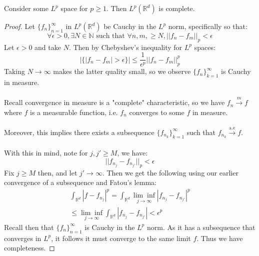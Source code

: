 \documentclass[12pt]{article}
\newcommand{\N}{\mathbb{N}}
\newcommand{\R}{\mathbb{R}}
\newenvironment{theorem}[2][Theorem]{\begin{trivlist}
\item[\hskip \labelsep {\bfseries #1}\hskip \labelsep {\bfseries #2.}]}{\end{trivlist}}
\begin{document}
\begin{theorem}{(Lp Spaces are Complete)}
    Consider some $L^p$ space for $p \geq 1$. Then $L^p(\R^d)$ is complete.
    \begin{proof}
        Let $\{f_n\}_{n = 1}^\infty$ in $L^p(\R^d)$ be Cauchy in the $L^p$ norm, specifically so that:
        $$\forall \epsilon > 0, \exists N \in \N \text{ such that } \forall n, m, \geq N, ||f_n - f_{m}||_p < \epsilon$$
        Let $\epsilon > 0$ and take $N$. Then by Chebyshev's inequality for $L^p$ spaces:
        \begin{equation}
            |\{|f_n - f_{m}| > \epsilon \}| \leq \frac{1}{\epsilon^p} ||f_n - f_{m}||_p^p
        \end{equation}
        Taking $N \rightarrow \infty$ makes the latter quality small, so we observe $\{f_n\}_{k = 1}^\infty$ is Cauchy in measure.  \\ \\
        Recall convergence in measure is a "complete" characteristic, so we have $f_n \xrightarrow{m} f$ where $f$ is a measurable function, i.e. $f_n$ converges to some $f$ in measure. \\ \\
        Moreover, this implies there exists a subsequence $\{f_{n_k}\}_{k = 1}^\infty$ such that $f_{n_k} \xrightarrow{\text{a.e}} f$. \\ \\
        With this in mind, note for $j, j' \geq M$, we have:
        $$||f_{n_j} - f_{n_{j'}}||_p < \epsilon$$
        Fix $j \geq M$ then, and let $j' \rightarrow \infty$. Then we get the following using our earlier convergence of a subsequence and Fatou's lemma:
        \begin{equation}
            \begin{aligned}
                \int_{\R^d} |f - f_{n_j}|^p = \int_{\R^d} \underset{j \rightarrow \infty}{\lim \inf} |f_{n_j} - f_{n_{j'}}|^p \\
                \leq \underset{j \rightarrow \infty}{\lim \inf} \int_{\R^d} |f_{n_j} - f_{n_{j'}}| < \epsilon^p     
            \end{aligned}
        \end{equation}
        Recall then that $\{f_n\}_{n = 1}^\infty$ is Cauchy in the $L^p$ norm. As it has a subsequence that converges in $L^p$, it follows it must converge to the same limit $f$. Thus we have completeness.
    \end{proof}
\end{theorem}
\end{document}

